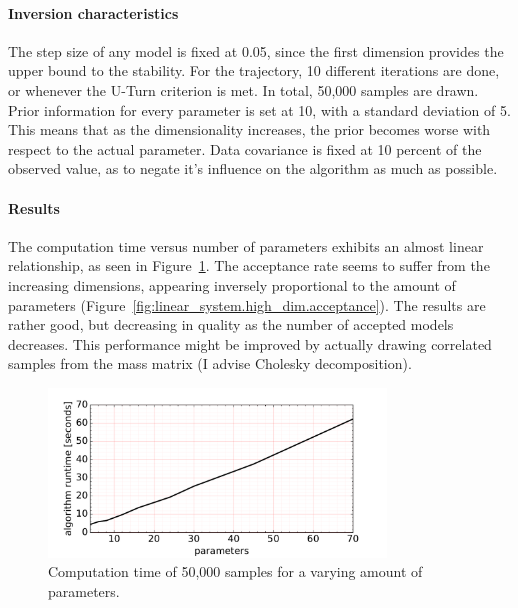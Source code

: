 \paragraph{Inversion characteristics}The step size of any model is fixed at 0.05, since the first dimension provides the upper bound to the stability. For the trajectory, 10 different iterations are done, or whenever the U-Turn criterion is met. In total, 50,000 samples are drawn. Prior information for every parameter is set at 10, with a standard deviation of 5. This means that as the dimensionality increases, the prior becomes worse with respect to the actual parameter. Data covariance is fixed at 10 percent of the observed value, as to negate it's influence on the algorithm as much as possible. 

\paragraph{Results}The computation time versus number of parameters exhibits an almost linear relationship, as seen in Figure~\ref{fig:linear_system.high_dim.time}. The acceptance rate seems to suffer from the increasing dimensions, appearing inversely proportional to the amount of parameters (Figure~\ref{fig:linear_system.high_dim.acceptance}). The results are rather good, but decreasing in quality as the number of accepted models decreases. This performance might be improved by actually drawing correlated samples from the mass matrix (I advise Cholesky decomposition).

\begin{figure}
	\centering
	\includegraphics[width=0.8\textwidth]{simple-linear-system/figures/higher_dim/performance}
	\caption{Computation time of 50,000 samples for a varying amount of parameters.}
	\label{fig:linear_system.high_dim.time}
\end{figure}

